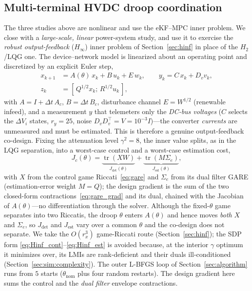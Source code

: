 \documentclass[twocolumn,amsthm]{autart}
\begin{document}
\subsection{Multi-terminal HVDC droop coordination}
\label{sec:sim:mtdc}

The three studies above are nonlinear and use the eKF--MPC inner problem. We close
with a \emph{large-scale, linear} power-system study, and use it to exercise the
\emph{robust output-feedback} ($H_\infty$) inner problem of Section~\ref{sec:hinf} in
place of the $H_2$/LQG one. The device--network model is linearized about an
operating point and discretized by an explicit Euler step,
\begin{equation}\label{eq:lin-ss}
\begin{aligned}
x_{k+1}&=A(\theta)\,x_k+B\,u_k+E\,w_k,\qquad
y_k=C\,x_k+D_v v_k,\\
z_k&=[\,Q^{1/2}x_k;\,R^{1/2}u_k\,],
\end{aligned}
\end{equation}
with $A=I+\Delta t\,A_c$, $B=\Delta t\,B_c$, disturbance channel $E=W^{1/2}$
(renewable infeed), and a measurement $y$ that telemeters only the \emph{DC-bus
voltages} ($C$ selects the $\Delta V_i$ states, $r_y=25$, noise
$D_vD_v^\top=V=10^{-3}I$)---the converter \emph{currents} are unmeasured and must be
estimated. This is therefore a genuine output-feedback co-design. Fixing the
attenuation level $\gamma^2=8$, the inner value splits, as in the LQG separation,
into a worst-case control and a worst-case estimation cost,
\begin{equation}\label{eq:mtdc-Jc}
J_c(\theta)=\underbrace{\operatorname{tr}(XW)}_{J_{\mathrm{det}}(\theta)}
          +\underbrace{\operatorname{tr}(M\Sigma_e)}_{J_{\mathrm{est}}(\theta)},
\end{equation}
with $X$ from the control game Riccati~\eqref{eq:gare} and $\Sigma_e$ from its dual
filter GARE (estimation-error weight $M=Q$); the design gradient is the sum of the
two closed-form contractions~\eqref{eq:gare_grad} and its dual, chained with the
Jacobian of $A(\theta)$---no differentiation through the solver. Although the
fixed-$\theta$ game separates into two Riccatis, the droop $\theta$ enters $A(\theta)$
and hence moves \emph{both} $X$ and $\Sigma_e$, so $J_{\mathrm{det}}$ and
$J_{\mathrm{est}}$ vary over a common $\theta$ and the co-design does not separate.
We take the $O(r_x^3)$ game-Riccati route (Section~\ref{sec:hinf}); the SDP form
\eqref{eq:Hinf_cont}--\eqref{eq:Hinf_est} is avoided because, at the interior
$\gamma$ optimum it minimizes over, its LMIs are rank-deficient and their duals
ill-conditioned (Section~\ref{sec:sim:complexity}). The outer L-BFGS loop of
Section~\ref{sec:algorithm} runs from $5$ starts ($\theta_{\mathrm{nom}}$ plus four
random restarts). The design gradient here sums the control and the \emph{dual
filter} envelope contractions.
\end{document}
